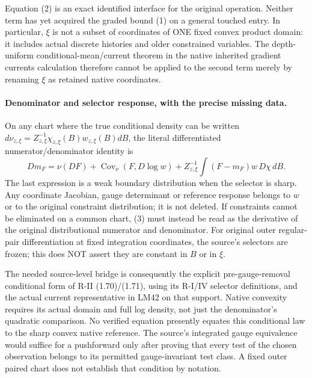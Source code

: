 \documentclass[11pt]{article}
\newcommand{\Cov}{\operatorname{Cov}}
\begin{document}
Equation (2) is an exact identified interface for the original operation. Neither
term has yet acquired the graded bound (1) on a general touched entry. In particular,
$\xi$ is not a subset of coordinates of ONE fixed convex product domain: it includes
actual discrete histories and older constrained variables. The depth-uniform
conditional-mean/current theorem in the native inherited gradient currents calculation therefore cannot be applied to the
second term merely by renaming $\xi$ as retained native coordinates.

\paragraph{Denominator and selector response, with the precise missing data.}
On any chart where the true conditional density can be written
$d\nu_{z,\xi}=Z_{z,\xi}^{-1}\chi_{z,\xi}(B)w_{z,\xi}(B)dB$,
the literal differentiated numerator/denominator identity is
\[
 D m_F=\nu(DF)+\Cov_\nu(F,D\log w)
 +Z_{z,\xi}^{-1}\int (F-m_F)w\,D\chi\,dB.       \tag{3}
\]
The last expression is a weak boundary distribution when the selector is sharp.
Any coordinate Jacobian, gauge determinant or reference response belongs to $w$
or to the original constraint distribution; it is not deleted. If constraints
cannot be eliminated on a common chart, (3) must instead be read as the derivative
of the original distributional numerator and denominator. For original outer
regular-pair differentiation at fixed integration coordinates, the source's
selectors are frozen; this does NOT assert they are constant in $B$ or in $\xi$.

The needed source-level bridge is consequently the explicit pre-gauge-removal
conditional form of R-II (1.70)/(1.71), using its R-I/IV selector definitions,
and the actual current representative in LM42 on that support. Native convexity
requires its actual domain and full log density, not just the denominator's
quadratic comparison. No verified equation presently equates this conditional
law to the sharp convex native reference. The source's integrated gauge equivalence
would suffice for a pushforward only after proving that every test of the chosen
observation belongs to its permitted gauge-invariant test class. A fixed outer
paired chart does not establish that condition by notation.
\end{document}
